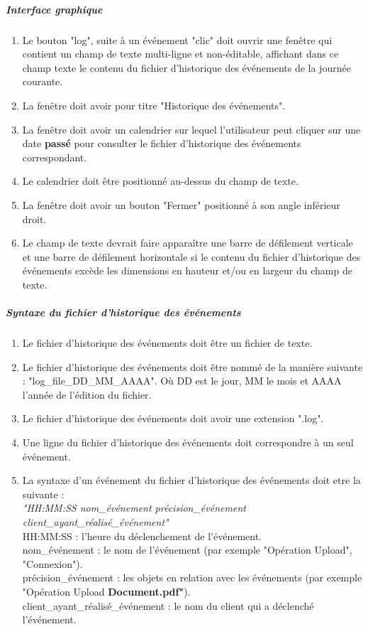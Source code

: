 \documentclass[10pt,a4paper]{report}
\begin{document}
		\subparagraph{Interface graphique}
			\begin{enumerate}
		
			\item Le bouton "log", suite à un événement "clic" doit ouvrir une fenêtre qui contient un champ de texte multi-ligne et non-éditable, affichant dans ce champ texte le contenu du fichier d'historique des événements de la journée courante.
		
			\item La fenêtre doit avoir pour titre "Historique des événements".
		
			\item La fenêtre doit avoir un calendrier sur lequel l'utilisateur peut cliquer sur une date \textbf{passé} pour consulter le fichier d'historique des événements correspondant.
		
			\item Le calendrier doit être positionné au-dessus du champ de texte.
		
			\item La fenêtre doit avoir un bouton "Fermer" positionné à son angle inférieur droit.
			\item Le champ de texte devrait faire apparaître une barre de défilement verticale et une barre de défilement horizontale si le contenu du fichier d'historique des événements excède les dimensions en hauteur et/ou en largeur du champ de texte.
		\end{enumerate}
		
		\subparagraph{Syntaxe du fichier d'historique des événements}
			\begin{enumerate}
				\item Le fichier d'historique des événements doit être un fichier de texte.
				
				\item Le fichier d'historique des événements doit être nommé de la manière suivante : "log\_file\_DD\_MM\_AAAA". Où DD est le jour, MM le mois et AAAA l'année de l'édition du fichier.
				
				\item Le fichier d'historique des événements doit avoir une extension ".log".
				\item Une ligne du fichier d'historique des événements doit correspondre à un seul événement.
				
				\item La syntaxe d'un événement du fichier d'historique des événements doit etre la suivante : \\
		\textit{"HH:MM:SS nom\_événement précision\_événement client\_ayant\_réalisé\_événement"}\\
		HH:MM:SS :  l'heure du déclenchement de l'événement.\\
		nom\_événement : le nom de l'événement (par exemple "Opération Upload", "Connexion").\\
		précision\_événement : les objets en relation avec les événements (par exemple "Opération Upload \textbf{Document.pdf"}).\\
		client\_ayant\_réalisé\_événement : le nom du client qui a déclenché l'événement.\\		
	\end{enumerate}
\end{document}
